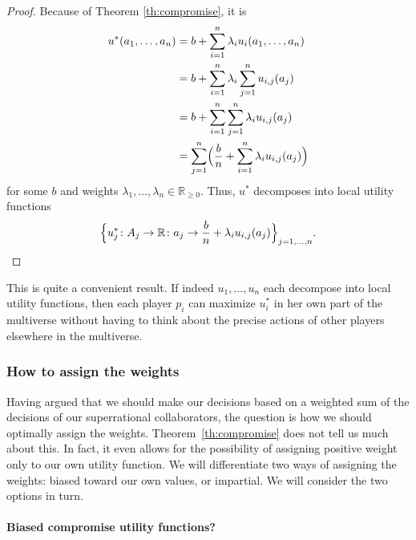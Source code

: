 \begin{proof}
Because of Theorem \ref{th:compromise}, it is 
\begin{equation*}
    \begin{split}
        u^{*}(a_{1},\dotsc,a_{n}) &= b + \sum_{i=1}^n\lambda_{i}u_{i}(a_{1},\dotsc,a_{n}) \\
                               &= b + \sum_{i=1}^n\lambda_{i}\sum_{j=1}^nu_{i,j}(a_{j}) \\
                               &= b + \sum_{i=1}^n\sum_{j=1}^n\lambda_{i}u_{i,j}(a_{j}) \\
                               &= \sum_{j=1}^n\Bigl(\frac{b}{n} +
                               \sum_{i=1}^n\lambda_{i}u_{i,j}(a_{j})\Bigr)\\
    \end{split}
\end{equation*}
for some \(b\) and weights \(\lambda_{1},\dotsc,\lambda_{n}
\in \mathbb{R}_{\geq 0}\). Thus, \(u^{*}\) decomposes into local utility functions
\begin{equation*}
\Bigl\{u_j^*\colon A_j \rightarrow \mathbb{R}\colon a_j \rightarrow \frac{b}{n} + \lambda_i
u_{i,j}(a_{j})\Bigr\}_{j = 1,\dotsc,n}.
\end{equation*}
\end{proof}
This is quite a convenient result. If indeed \(u_{1},\dotsc,u_{n}\) each
decompose into local utility functions, then each player \(p_{i}\) can
maximize \(u_{i}^{*}\) in her own part of the multiverse without having
to think about the precise actions of other players elsewhere in the
multiverse.

\hypertarget{how-to-assign-the-weights}{\subsubsection{How to assign the
weights}\label{how-to-assign-the-weights}}

Having argued that we should make our decisions based on a weighted sum
of the decisions of our superrational collaborators, the question is how
we should optimally assign the weights. Theorem~\ref{th:compromise} does not tell us much
about this. In fact, it even allows for the possibility of assigning
positive weight only to our own utility function. We will differentiate
two ways of assigning the weights: biased toward our own values, or
impartial. We will consider the two options in turn.

\paragraph{Biased compromise utility
functions?}\label{biased-compromise-utility-functions}

